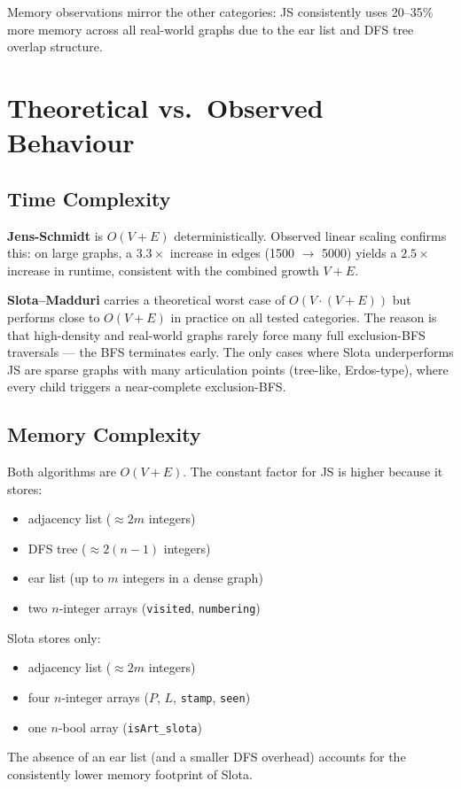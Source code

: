 \documentclass[12pt,a4paper]{article}
\newcommand{\code}[1]{\texttt{#1}}
\begin{document}
Memory observations mirror the other categories: JS consistently uses
20--35\% more memory across all real-world graphs due to the ear list and
DFS tree overlap structure.


\section{Theoretical vs.\ Observed Behaviour}

\subsection{Time Complexity}

\textbf{Jens-Schmidt} is $O(V+E)$ deterministically.  Observed linear
scaling confirms this: on large graphs, a $3.3\times$ increase in edges
(1500 $\to$ 5000) yields a $2.5\times$ increase in runtime, consistent
with the combined growth $V + E$.

\textbf{Slota--Madduri} carries a theoretical worst case of
$O(V \cdot (V+E))$ but performs close to $O(V+E)$ in practice on all
tested categories.  The reason is that high-density and real-world graphs
rarely force many full exclusion-BFS traversals --- the BFS terminates
early.  The only cases where Slota underperforms JS are sparse graphs with
many articulation points (tree-like, Erdos-type), where every child triggers
a near-complete exclusion-BFS.

\subsection{Memory Complexity}

Both algorithms are $O(V+E)$.  The constant factor for JS is higher
because it stores:
\begin{itemize}
    \item adjacency list ($\approx 2m$ integers)
    \item DFS tree ($\approx 2(n-1)$ integers)
    \item ear list (up to $m$ integers in a dense graph)
    \item two $n$-integer arrays (\code{visited}, \code{numbering})
\end{itemize}
Slota stores only:
\begin{itemize}
    \item adjacency list ($\approx 2m$ integers)
    \item four $n$-integer arrays ($P$, $L$, \code{stamp}, \code{seen})
    \item one $n$-bool array (\code{isArt\_slota})
\end{itemize}
The absence of an ear list (and a smaller DFS overhead) accounts for the
consistently lower memory footprint of Slota.
\end{document}
